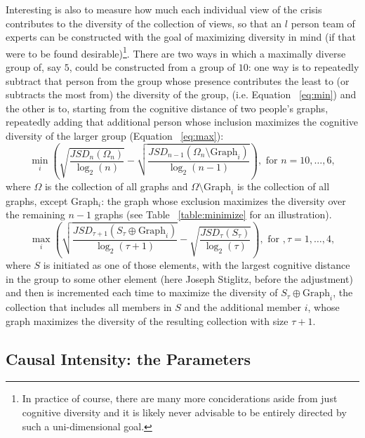 \documentclass[12pt]{article}
\begin{document}
Interesting is also to measure how much each individual view of the crisis contributes to the diversity of the collection of views, so that an $l$ person team of experts can be constructed with the goal of maximizing diversity in mind (if that were to be found desirable)\footnote{In practice of course, there are many more conciderations aside from just cognitive diversity and it is likely never advisable to be entirely directed by such a uni-dimensional goal.}. There are two ways in which a maximally diverse group of, say $5$, could be constructed from a group of $10$: one way is to repeatedly subtract that person from the group whose presence contributes the least to (or subtracts the most from) the diversity of the group, (i.e. Equation ~\ref{eq:min}) and the other is to, starting from the cognitive distance of two people's graphs, repeatedly adding that additional person whose inclusion maximizes the cognitive diversity of the larger group (Equation ~\ref{eq:max}):
\begin{equation}\label{eq:min}
\min_i\left(\sqrt{\frac{JSD_n(\Omega_n)}{\log_2(n)}}-\sqrt{\frac{JSD_{n-1}(\Omega_n\setminus\text{Graph}_i)}{\log_2(n-1)}}\right), \text{ for } n=10, \ldots, 6,
\end{equation}
where $\Omega$ is the collection of all graphs and $\Omega\setminus\text{Graph}_i$ is the collection of all graphs, except Graph$_i$: the graph whose exclusion maximizes the diversity over the remaining $n-1$ graphs (see Table ~\ref{table:minimize} for an illustration).
\begin{equation}\label{eq:max}
\max_i\left(\sqrt{\frac{JSD_{\tau+1}(S_{\tau}\oplus\text{Graph}_i)}{\log_2(\tau+1)}}-\sqrt{\frac{JSD_{\tau}(S_{\tau})}{\log_2(\tau)}}\right), \text{ for }, \tau=1, \ldots, 4,
\end{equation}
where $S$ is initiated as one of those elements, with the largest cognitive distance in the group to some other element (here Joseph Stiglitz, before the adjustment) and then is incremented each time to maximize the diversity of $S_{\tau}\oplus\text{Graph}_i$, the collection that includes all members in $S$ and the additional member $i$, whose graph maximizes the diversity of the resulting collection with size $\tau + 1$.

\subsection*{Causal Intensity: the Parameters}
\end{document}
